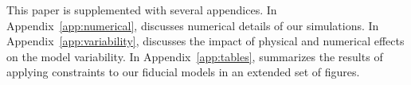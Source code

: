 This paper is supplemented with several appendices.
In Appendix~\ref{app:numerical},  discusses numerical details of our simulations.
In Appendix~\ref{app:variability}, discusses the impact of physical  and numerical effects on the model variability.
In Appendix~\ref{app:tables}, summarizes the results of applying constraints to our fiducial models in an extended set of figures. 
